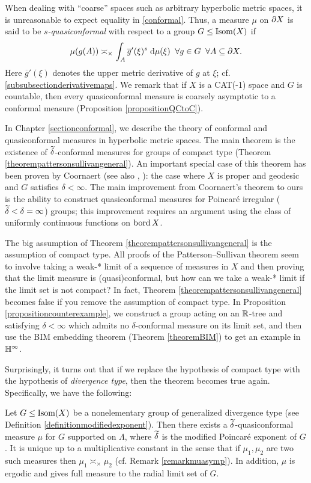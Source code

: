 When dealing with ``coarse'' spaces such as arbitrary hyperbolic metric spaces, it is unreasonable to expect equality in \eqref{conformal}. Thus, a measure $\mu$ on $\partial X$ is said to be \emph{$s$-quasiconformal} with respect to a group $G\leq\operatorname{Isom}(X)$ if
\[
\mu(g(A)) \asymp_\times \int_A \overline g'(\xi)^s\;\mathrm{d}\mu(\xi) \;\;\forall g\in G \;\;\forall A\subseteq \partial X.
\]
Here $\overline g'(\xi)$ denotes the upper metric derivative of $g$ at $\xi$; cf. \6\ref{subsubsectionderivativemaps}. We remark that if $X$ is a CAT(-1) space and $G$ is countable, then every quasiconformal measure is coarsely asymptotic to a conformal measure (Proposition \ref{propositionQCtoC}).

In Chapter \ref{sectionconformal}, we describe the theory of conformal and quasiconformal measures in hyperbolic metric spaces. The main theorem is the existence of $\widetilde\delta$-conformal measures for groups of compact type (Theorem \ref{theorempattersonsullivangeneral}). An important special case of this theorem has been proven by Coornaert \cite[Th\'eor\`eme 5.4]{Coornaert} (see also \cite[]{BurgerMozes}, \cite[Lemme 2.1.1]{Roblin2}): the case where $X$ is proper and geodesic and $G$ satisfies $\delta < \infty$. The main improvement from Coornaert's theorem to ours is the ability to construct quasiconformal measures for Poincar\'e irregular ($\widetilde\delta < \delta = \infty$) groups; this improvement requires an argument using the class of uniformly continuous functions on $\operatorname{bord} X$.

The big assumption of Theorem \ref{theorempattersonsullivangeneral} is the assumption of compact type. All proofs of the Patterson--Sullivan theorem seem to involve taking a weak-* limit of a sequence of measures in $X$ and then proving that the limit measure is (quasi)conformal, but how can we take a weak-* limit if the limit set is not compact? In fact, Theorem \ref{theorempattersonsullivangeneral} becomes false if you remove the assumption of compact type. In Proposition \ref{propositioncounterexample}, we construct a group acting on an $\R$-tree and satisfying $\delta < \infty$ which admits no $\delta$-conformal measure on its limit set, and then use the BIM embedding theorem (Theorem \ref{theoremBIM}) to get an example in $\H^\infty$.

Surprisingly, it turns out that if we replace the hypothesis of compact type with the hypothesis of \emph{divergence type}, then the theorem becomes true again. Specifically, we have the following:

\begin{theorem}
\label{theoremahlforsthurstongeneral}
Let $G\leq\operatorname{Isom}(X)$ be a nonelementary group of generalized divergence type (see Definition \ref{definitionmodifiedexponent}). Then there exists a $\widetilde\delta$-quasiconformal measure $\mu$ for $G$ supported on $\Lambda$, where $\widetilde\delta$ is the modified Poincar\'e exponent of $G$. It is unique up to a multiplicative constant in the sense that if $\mu_1,\mu_2$ are two such measures then $\mu_1\asymp_\times \mu_2$ (cf. Remark \ref{remarkmuasymp}). In addition, $\mu$ is ergodic and gives full measure to the radial limit set of $G$.
\end{theorem}

